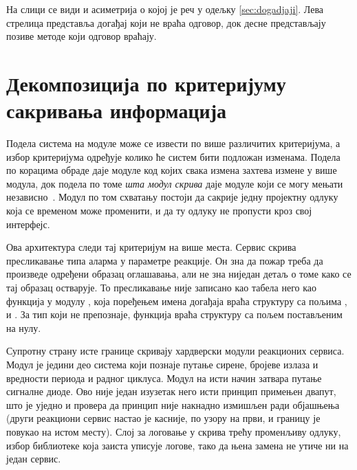\documentclass[12pt,oneside]{memoir}
\begin{document}
На слици се види и асиметрија о којој је реч у одељку \ref{sec:dogadjaji}. Лева стрелица
представља догађај који не враћа одговор, док десне представљају позиве методе који одговор
враћају.

\section{Декомпозиција по критеријуму сакривања информација}
\label{sec:dekompozicija}

Подела система на модуле може се извести по више различитих критеријума, а избор
критеријума одређује колико ће систем бити подложан изменама. Подела по корацима обраде даје
модуле код којих свака измена захтева измене у више модула, док подела по томе
\emph{шта модул скрива} даје модуле који се могу мењати независно~\cite{Parnas1972}. Модул
по том схватању постоји да сакрије једну пројектну одлуку која се временом може променити,
и да ту одлуку не пропусти кроз свој интерфејс.

Ова архитектура следи тај критеријум на више места. Сервис  скрива
пресликавање типа аларма у параметре реакције. Он зна да пожар треба да произведе одређени
образац оглашавања, али не зна ниједан детаљ о томе како се тај образац остварује. То
пресликавање није записано као табела него као функција
 у модулу , која
поређењем имена догађаја враћа структуру  са пољима
,  и . За тип који не препознаје,
функција враћа структуру са пољем  постављеним на нулу.

Супротну страну исте границе скривају хардверски модули реакционих сервиса. Модул
 је једини део система који познаје  путање сирене, бројеве
излаза и вредности периода и радног циклуса. Модул  на исти начин затвара
путање сигналне диоде. Ово није један изузетак него исти принцип примењен двапут, што је уједно и
провера да принцип није накнадно измишљен ради објашњења (други реакциони сервис настао је
касније, по узору на први, и границу је повукао на истом месту). Слој за логовање у
 скрива трећу променљиву одлуку, избор библиотеке која заиста уписује логове,
тако да њена замена не утиче ни на један сервис.
\end{document}

